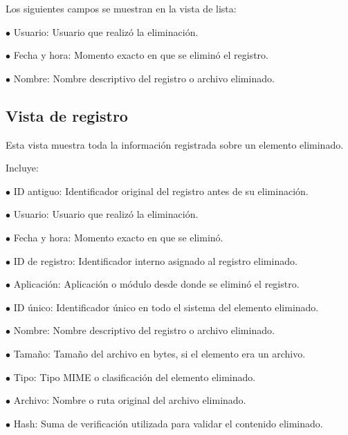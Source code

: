\documentclass[a4paper]{article}
\begin{document}
Los siguientes campos se muestran en la vista de lista:

\begin{compactitem}
\item[\color{myblue}$\bullet$] Usuario: Usuario que realizó la eliminación.
\item[\color{myblue}$\bullet$] Fecha y hora: Momento exacto en que se eliminó el registro.
\item[\color{myblue}$\bullet$] Nombre: Nombre descriptivo del registro o archivo eliminado.
\end{compactitem}

\hypertarget{toc34}{}
\subsection{Vista de registro}

Esta vista muestra toda la información registrada sobre un elemento eliminado.

Incluye:

\begin{compactitem}
\item[\color{myblue}$\bullet$] ID antiguo: Identificador original del registro antes de su eliminación.
\item[\color{myblue}$\bullet$] Usuario: Usuario que realizó la eliminación.
\item[\color{myblue}$\bullet$] Fecha y hora: Momento exacto en que se eliminó.
\item[\color{myblue}$\bullet$] ID de registro: Identificador interno asignado al registro eliminado.
\item[\color{myblue}$\bullet$] Aplicación: Aplicación o módulo desde donde se eliminó el registro.
\item[\color{myblue}$\bullet$] ID único: Identificador único en todo el sistema del elemento eliminado.
\item[\color{myblue}$\bullet$] Nombre: Nombre descriptivo del registro o archivo eliminado.
\item[\color{myblue}$\bullet$] Tamaño: Tamaño del archivo en bytes, si el elemento era un archivo.
\item[\color{myblue}$\bullet$] Tipo: Tipo MIME o clasificación del elemento eliminado.
\item[\color{myblue}$\bullet$] Archivo: Nombre o ruta original del archivo eliminado.
\item[\color{myblue}$\bullet$] Hash: Suma de verificación utilizada para validar el contenido eliminado.
\end{compactitem}
\end{document}
